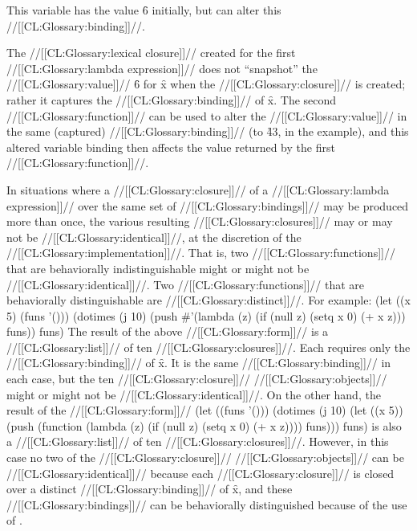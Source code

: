 This variable has the value \f{6} initially, but  can alter this //[[CL:Glossary:binding]]//.

The //[[CL:Glossary:lexical closure]]// created for the first  //[[CL:Glossary:lambda expression]]// does not ``snapshot'' the //[[CL:Glossary:value]]// \f{6} for \f{x} when the //[[CL:Glossary:closure]]// is created; rather it captures the //[[CL:Glossary:binding]]// of \f{x}. The second //[[CL:Glossary:function]]// can be used to alter the //[[CL:Glossary:value]]// in the same (captured) //[[CL:Glossary:binding]]// (to \f{43}, in the example), and this altered variable binding then affects the value returned by the first //[[CL:Glossary:function]]//.

                     

In situations where a //[[CL:Glossary:closure]]// of a  //[[CL:Glossary:lambda expression]]// over the same set of //[[CL:Glossary:bindings]]// may be produced more than once, the various resulting //[[CL:Glossary:closures]]// may or may not be //[[CL:Glossary:identical]]//, at the discretion of the //[[CL:Glossary:implementation]]//. That is, two //[[CL:Glossary:functions]]// that are behaviorally indistinguishable might or might not be //[[CL:Glossary:identical]]//. Two //[[CL:Glossary:functions]]// that are behaviorally distinguishable are //[[CL:Glossary:distinct]]//. For example:
  \code
 (let ((x 5) (funs '()))
   (dotimes (j 10)                          
     (push #'(lambda (z)                        
               (if (null z) (setq x 0) (+ x z)))
           funs))
   funs) \endcode The result of the above //[[CL:Glossary:form]]// is a //[[CL:Glossary:list]]// of ten //[[CL:Glossary:closures]]//. Each requires only the //[[CL:Glossary:binding]]// of \f{x}. It is the same //[[CL:Glossary:binding]]// in each case,  but the ten //[[CL:Glossary:closure]]// //[[CL:Glossary:objects]]// might or might not be //[[CL:Glossary:identical]]//. On the other hand, the result of the //[[CL:Glossary:form]]//
  \code
 (let ((funs '()))     
   (dotimes (j 10)
     (let ((x 5))
       (push (function (lambda (z)
                        (if (null z) (setq x 0) (+ x z))))
             funs)))
  funs) \endcode is also a //[[CL:Glossary:list]]// of ten //[[CL:Glossary:closures]]//. However, in this case no two of the //[[CL:Glossary:closure]]// //[[CL:Glossary:objects]]// can be //[[CL:Glossary:identical]]// because each //[[CL:Glossary:closure]]// is closed over a distinct //[[CL:Glossary:binding]]// of \f{x}, and these //[[CL:Glossary:bindings]]// can be behaviorally distinguished because of the use of .
 

